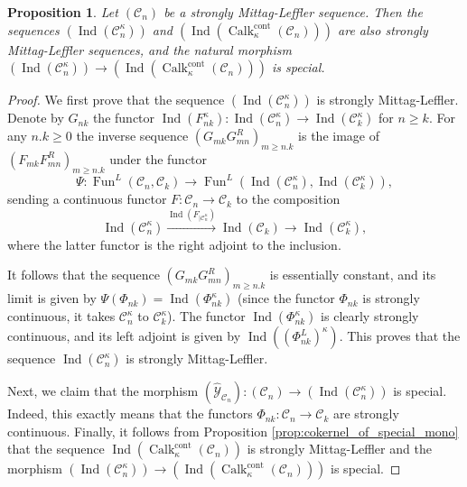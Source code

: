 \documentclass[11pt,leqno]{amsart}
\newtheorem{prop}[theo]{Proposition}
\numberwithin{equation}{section}
\newcommand{\xto}{\xrightarrow}
\newcommand{\cont}{\operatorname{cont}}
\newcommand{\cC}{{\mathcal C}}
\newcommand{\cY}{{\mathcal Y}}
\newcommand{\Fun}{\operatorname{Fun}}
\newcommand{\Ind}{\operatorname{Ind}}
\newcommand{\Calk}{\operatorname{Calk}}
\begin{document}
\begin{prop}\label{prop:Ind_and_Calk_of_ML} Let $(\cC_n)$ be a strongly Mittag-Leffler sequence. Then the sequences $(\Ind(\cC_n^{\kappa}))$ and $(\Ind(\Calk_{\kappa}^{\cont}(\cC_n)))$ are also strongly Mittag-Leffler sequences, and the natural morphism $(\Ind(\cC_n^{\kappa}))\to (\Ind(\Calk_{\kappa}^{\cont}(\cC_n)))$ is special.\end{prop}

\begin{proof}We first prove that the sequence $(\Ind(\cC_n^{\kappa}))$ is strongly Mittag-Leffler. Denote by $G_{nk}$ the functor $\Ind(F_{nk}^{\kappa}):\Ind(\cC_n^{\kappa})\to\Ind(\cC_k^{\kappa})$ for $n\geq k.$ For any $n.k\geq 0$ the inverse sequence $(G_{mk}G_{mn}^R)_{m\geq n.k}$ is the image of $(F_{mk}F_{mn}^R)_{m\geq n.k}$ under the functor
\begin{equation*}\Psi:\Fun^L(\cC_n,\cC_k)\to\Fun^L(\Ind(\cC_n^{\kappa}),\Ind(\cC_k^{\kappa})),\end{equation*}
sending a continuous functor $F:\cC_n\to\cC_k$ to the composition
\begin{equation*}
	\Ind(\cC_n^{\kappa})\xto{\Ind(F_{\mid \cC_n^{\kappa}})}\Ind(\cC_k)\to\Ind(\cC_k^{\kappa}),	
\end{equation*}
where the latter functor is the right adjoint to the inclusion.
	
It follows that the sequence $(G_{mk}G_{mn}^R)_{m\geq n.k}$ is essentially constant, and its limit is given by $\Psi(\Phi_{nk})=\Ind(\Phi_{nk}^{\kappa})$ (since the functor $\Phi_{nk}$ is strongly continuous, it takes $\cC_n^{\kappa}$ to $\cC_k^{\kappa}$). The functor $\Ind(\Phi_{nk}^{\kappa})$ is clearly strongly continuous, and its left adjoint is given by $\Ind((\Phi_{nk}^L)^{\kappa}).$ This proves that the sequence $\Ind(\cC_n^{\kappa})$ is strongly Mittag-Leffler.
	
Next, we claim that the morphism $(\hat{\cY}_{\cC_n}):(\cC_n)\to(\Ind(\cC_n^{\kappa}))$ is special. Indeed, this exactly means that the functors $\Phi_{nk}:\cC_n\to\cC_k$ are strongly continuous. Finally, it follows from Proposition \ref{prop:cokernel_of_special_mono} that the sequence $\Ind(\Calk_{\kappa}^{\cont}(\cC_n))$ is strongly Mittag-Leffler and the morphism $(\Ind(\cC_n^{\kappa}))\to (\Ind(\Calk_{\kappa}^{\cont}(\cC_n)))$ is special.\end{proof}
\end{document}
